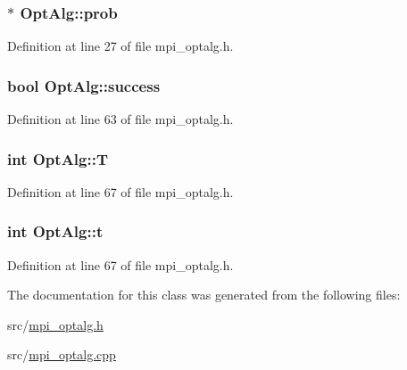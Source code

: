 \subsubsection[{prob}]{$\ast$ Opt\+Alg\+::prob}\label{class_opt_alg_ad83a3cc560bd483e499f26f629817f21}


Definition at line 27 of file mpi\+\_\+optalg.\+h.

\hypertarget{class_opt_alg_a2150acef11d441cb786afe578051e56f}{}
\subsubsection[{success}]{\setlength{\rightskip}{0pt plus 5cm}bool Opt\+Alg\+::success}\label{class_opt_alg_a2150acef11d441cb786afe578051e56f}


Definition at line 63 of file mpi\+\_\+optalg.\+h.

\hypertarget{class_opt_alg_a9cbac99eb4f69fb2a3860ecec0dd3dc3}{}
\subsubsection[{T}]{\setlength{\rightskip}{0pt plus 5cm}int Opt\+Alg\+::\+T\hspace{0.3cm}{\ttfamily [protected]}}\label{class_opt_alg_a9cbac99eb4f69fb2a3860ecec0dd3dc3}


Definition at line 67 of file mpi\+\_\+optalg.\+h.

\hypertarget{class_opt_alg_a716972bd2e408aa4b77be28fa2f0cbb1}{}
\subsubsection[{t}]{\setlength{\rightskip}{0pt plus 5cm}int Opt\+Alg\+::t\hspace{0.3cm}{\ttfamily [protected]}}\label{class_opt_alg_a716972bd2e408aa4b77be28fa2f0cbb1}


Definition at line 67 of file mpi\+\_\+optalg.\+h.



The documentation for this class was generated from the following files\+:\begin{DoxyCompactItemize}
\item 
src/\hyperlink{mpi__optalg_8h}{mpi\+\_\+optalg.\+h}\item 
src/\hyperlink{mpi__optalg_8cpp}{mpi\+\_\+optalg.\+cpp}\end{DoxyCompactItemize}
